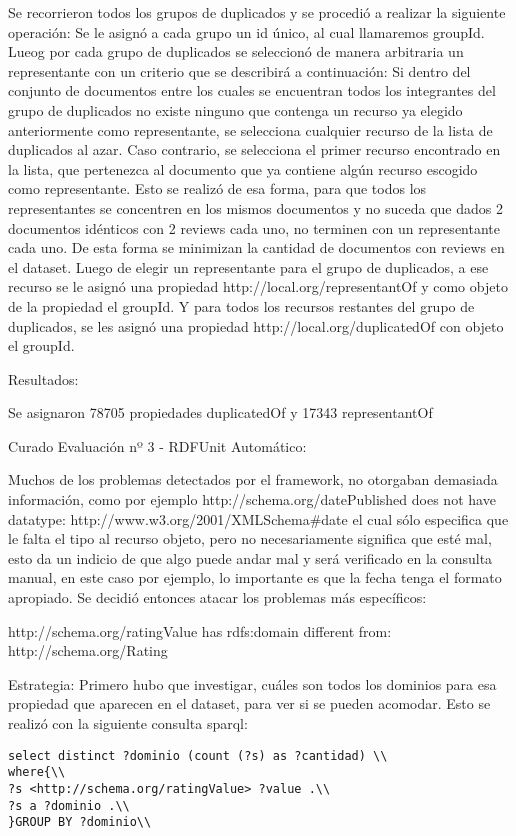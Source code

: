 Se recorrieron todos los grupos de duplicados y se procedió a realizar la siguiente operación:
Se le asignó a cada grupo un id único, al cual llamaremos groupId.
Lueog por cada grupo de duplicados se seleccionó de manera arbitraria un representante con un criterio que se describirá a continuación:
Si dentro del conjunto de documentos entre los cuales se encuentran todos los integrantes del grupo de duplicados no existe ninguno 
que contenga un recurso ya elegido anteriormente como representante, se selecciona cualquier recurso de la lista de duplicados al azar.
Caso contrario, se selecciona el primer recurso encontrado en la lista, que pertenezca al documento que ya contiene algún recurso escogido 
como representante.
Esto se realizó de esa forma, para que todos los representantes se concentren en los mismos documentos y no suceda que dados 2 
documentos idénticos con 2 reviews cada uno, no terminen con un representante cada uno. De esta forma se minimizan la cantidad de 
documentos con reviews en el dataset.
Luego de elegir un representante para el grupo de duplicados, a ese recurso se le asignó una propiedad http://local.org/representantOf y 
como objeto de la propiedad el groupId.
Y para todos los recursos restantes del grupo de duplicados, se les asignó una propiedad http://local.org/duplicatedOf con objeto 
el groupId.

Resultados:

Se asignaron 78705 propiedades duplicatedOf y 17343 representantOf

Curado Evaluación nº 3 - RDFUnit Automático:

Muchos de los problemas detectados por el framework, no otorgaban demasiada información, como por ejemplo
http://schema.org/datePublished does not have datatype: http://www.w3.org/2001/XMLSchema\#date el cual sólo especifica que le 
falta el tipo al recurso objeto, pero no necesariamente significa que esté mal, esto da un indicio de que algo puede andar mal
y será verificado en la consulta manual, en este caso por ejemplo, lo importante es que la fecha tenga el formato apropiado.
Se decidió entonces atacar los problemas más específicos:

http://schema.org/ratingValue has rdfs:domain different from: http://schema.org/Rating

Estrategia:
Primero hubo que investigar, cuáles son todos los dominios para esa propiedad que aparecen en el dataset, para ver si se pueden 
acomodar. Esto se realizó con la siguiente consulta sparql:

\begin{lstlisting}[frame=single]  
select distinct ?dominio (count (?s) as ?cantidad) \\
where{\\
?s <http://schema.org/ratingValue> ?value .\\
?s a ?dominio .\\
}GROUP BY ?dominio\\
\end{lstlisting}


